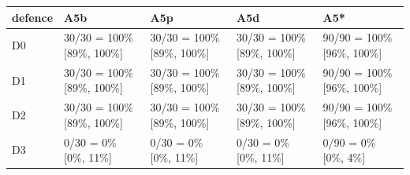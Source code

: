 \begin{tabular}{lllll}
\toprule
defence & A5b & A5p & A5d & A5* \\
\midrule
D0 & 30/30 = 100\% [89\%, 100\%] & 30/30 = 100\% [89\%, 100\%] & 30/30 = 100\% [89\%, 100\%] & 90/90 = 100\% [96\%, 100\%] \\
D1 & 30/30 = 100\% [89\%, 100\%] & 30/30 = 100\% [89\%, 100\%] & 30/30 = 100\% [89\%, 100\%] & 90/90 = 100\% [96\%, 100\%] \\
D2 & 30/30 = 100\% [89\%, 100\%] & 30/30 = 100\% [89\%, 100\%] & 30/30 = 100\% [89\%, 100\%] & 90/90 = 100\% [96\%, 100\%] \\
D3 & 0/30 = 0\% [0\%, 11\%] & 0/30 = 0\% [0\%, 11\%] & 0/30 = 0\% [0\%, 11\%] & 0/90 = 0\% [0\%, 4\%] \\
\bottomrule
\end{tabular}
